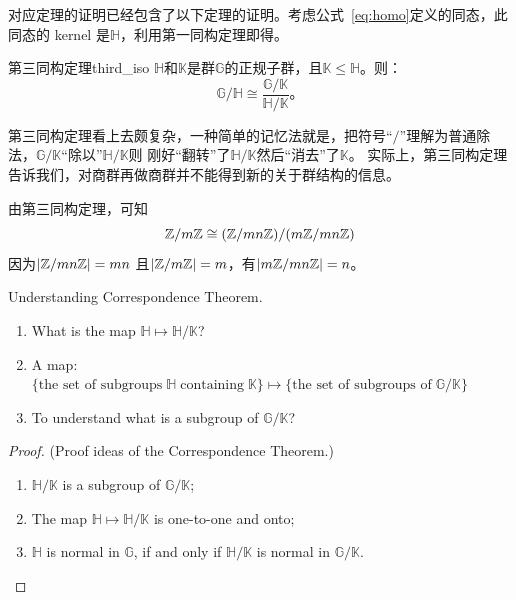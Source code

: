 对应定理的证明已经包含了以下定理的证明。考虑公式~\ref{eq:homo}定义的同态，此同态的 kernel 是$\mathbb{H}$，利用第一同构定理即得。
\begin{theorem}{第三同构定理}{third_iso}
$\mathbb{H}$和$\mathbb{K}$是群$\mathbb{G}$的正规子群，且$\mathbb{K}\le \mathbb{H}$。则：
\[\mathbb{G}/ \mathbb{H} \cong \frac{\mathbb{G}/\mathbb{K}}{\mathbb{H}/\mathbb{K}}\text{。}\]
\end{theorem}
第三同构定理看上去颇复杂，一种简单的记忆法就是，把符号“$/$”理解为普通除法，$\mathbb{G}/ \mathbb{K}$“除以”$\mathbb{H}/\mathbb{K}$则
刚好“翻转”了$\mathbb{H}/\mathbb{K}$然后“消去”了$\mathbb{K}$。
实际上，第三同构定理告诉我们，对商群再做商群并不能得到新的关于群结构的信息。
\begin{example}
\label{exm:third_iso}
由第三同构定理，可知
\[ {\mathbb Z} / m {\mathbb Z} \cong ({\mathbb Z} / mn {\mathbb Z}) / (m {\mathbb Z} / mn {\mathbb Z}) \]
因为$\lvert {\mathbb Z} / mn {\mathbb Z} \rvert = mn$ 且$\lvert {\mathbb Z} / m{\mathbb Z} \rvert = m$，有$\lvert m {\mathbb Z} / mn {\mathbb Z} \rvert = n$。
\end{example}

\iffalse

	\begin{remark}{Understanding Correspondence Theorem.}
	\begin{enumerate}
    	\item What is the map $\mathbb{H} \mapsto \mathbb{H}/\mathbb{K}$?
		   
		 \item A map: $\{\text{the set of subgroups}\; \mathbb{H} \;\text{containing}\; \mathbb{K}\}  \mapsto \{\text{the set of subgroups of}\; \mathbb{G}/\mathbb{K}\}$ 
		  
		  \item To understand what is a subgroup of $\mathbb{G}/\mathbb{K}$?
	\end{enumerate}
	
	\end{remark}

	\begin{proof}{(Proof ideas of the Correspondence Theorem.)}
	\begin{enumerate}
	    \item $\mathbb{H}/\mathbb{K}$ is a subgroup of $\mathbb{G}/\mathbb{K}$;
	
    	\item The map $\mathbb{H} \mapsto \mathbb{H}/\mathbb{K}$ is one-to-one and onto;
		 
		 \item $\mathbb{H}$ is normal in $\mathbb{G}$, if and only if $\mathbb{H}/\mathbb{K}$ is normal in $\mathbb{G}/\mathbb{K}$.
	\end{enumerate}
	
	\end{proof}



